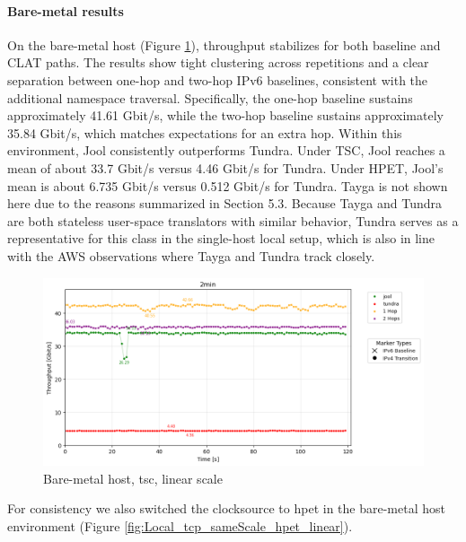 \paragraph{Bare-metal results}

On the bare-metal host (Figure \ref{fig:Local_tcp_sameScale_tsc_linear}), throughput stabilizes for both baseline and CLAT paths. The results show tight clustering across repetitions and a clear separation between one-hop and two-hop IPv6 baselines, consistent with the additional namespace traversal. Specifically, the one-hop baseline sustains approximately 41.61 Gbit/s, while the two-hop baseline sustains approximately 35.84 Gbit/s, which matches expectations for an extra hop. Within this environment, Jool consistently outperforms Tundra. Under TSC, Jool reaches a mean of about 33.7 Gbit/s versus 4.46 Gbit/s for Tundra. Under HPET, Jool's mean is about 6.735 Gbit/s versus 0.512 Gbit/s for Tundra. Tayga is not shown here due to the reasons summarized in Section 5.3. Because Tayga and Tundra are both stateless user-space translators with similar behavior, Tundra serves as a representative for this class in the single-host local setup, which is also in line with the AWS observations where Tayga and Tundra track closely.

\begin{figure}[H]
    \centering
    \includegraphics[width=1\textwidth]{resources/finalPlots/combinedplots/SingleLocal_tcp_sameScale_tsc_2min_linear.png}
    \caption{Bare-metal host, tsc, linear scale}
    \label{fig:Local_tcp_sameScale_tsc_linear}
\end{figure}

For consistency we also switched the clocksource to hpet in the bare-metal host environment (Figure \ref{fig:Local_tcp_sameScale_hpet_linear}).


